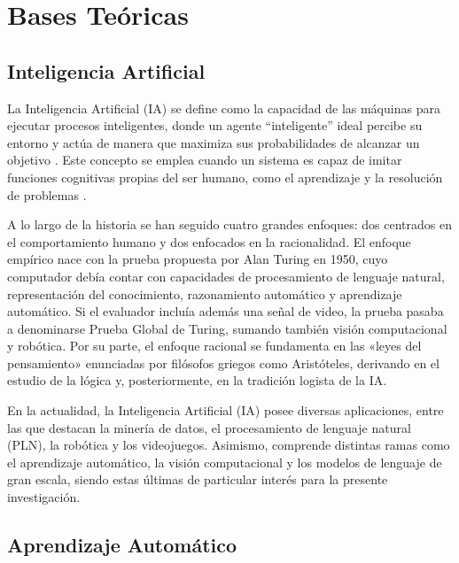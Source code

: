 \documentclass[listof=nochaptergap,12pt,times,authoryear]{report}
\begin{document}
\section{Bases Teóricas}

\subsection{Inteligencia Artificial}
 
La Inteligencia Artificial (IA) se define como la capacidad de las máquinas para ejecutar procesos inteligentes, donde un agente “inteligente” ideal percibe su entorno y actúa de manera que maximiza sus probabilidades de alcanzar un objetivo \parencite{bk_russell2009intart}. Este concepto se emplea cuando un sistema es capaz de imitar funciones cognitivas propias del ser humano, como el aprendizaje y la resolución de problemas \parencite{bk_russell2004intart}.

A lo largo de la historia se han seguido cuatro grandes enfoques: dos centrados en el comportamiento humano y dos enfocados en la racionalidad. El enfoque empírico nace con la prueba propuesta por Alan Turing en 1950, cuyo computador debía contar con capacidades de procesamiento de lenguaje natural, representación del conocimiento, razonamiento automático y aprendizaje automático. Si el evaluador incluía además una señal de video, la prueba pasaba a denominarse Prueba Global de Turing, sumando también visión computacional y robótica. Por su parte, el enfoque racional se fundamenta en las «leyes del pensamiento» enunciadas por filósofos griegos como Aristóteles, derivando en el estudio de la lógica y, posteriormente, en la tradición logista de la IA.
 
En la actualidad, la Inteligencia Artificial (IA) posee diversas aplicaciones, entre las que destacan la minería de datos, el procesamiento de lenguaje natural (PLN), la robótica y los videojuegos. Asimismo, comprende distintas ramas como el aprendizaje automático, la visión computacional y los modelos de lenguaje de gran escala, siendo estas últimas de particular interés para la presente investigación.
 
\subsection{Aprendizaje Automático}
 
\end{document}
